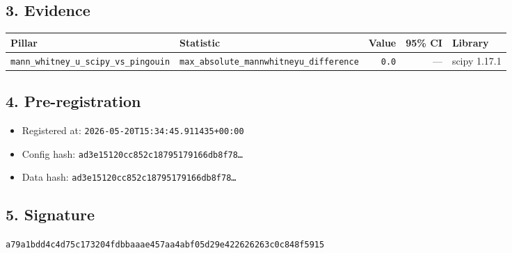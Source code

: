 \documentclass{article}
\begin{document}
\subsection*{3. Evidence}
\begin{tabular}{llrrl}\toprule
\textbf{Pillar} & \textbf{Statistic} & \textbf{Value} & \textbf{95\% CI} & \textbf{Library} \\\midrule
\texttt{mann\_whitney\_u\_scipy\_vs\_pingouin} & \texttt{max\_absolute\_mannwhitneyu\_difference} & \texttt{0.0} & --- & scipy 1.17.1 \\
\bottomrule\end{tabular}
\subsection*{4. Pre-registration}
\begin{itemize}
\item Registered at: \texttt{2026-05-20T15:34:45.911435+00:00}
\item Config hash: \texttt{ad3e15120cc852c18795179166db8f78\dots}
\item Data hash: \texttt{ad3e15120cc852c18795179166db8f78\dots}
\end{itemize}
\subsection*{5. Signature}
\texttt{a79a1bdd4c4d75c173204fdbbaaae457aa4abf05d29e422626263c0c848f5915}\\
\end{document}
